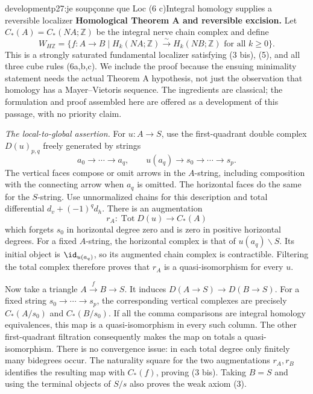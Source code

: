 \begin{dcomment}{development}{p27:je soupçonne que Loc (6 c)}{Integral homology supplies a reversible localizer}
\textbf{Homological Theorem A and reversible excision.}\ours
Let $C_*(A)=C_*(NA;\mathbb Z)$ be the integral nerve chain complex and define
\[
W_{H\mathbb Z}=\{f:A\to B\mid H_k(NA;\mathbb Z)\xrightarrow{\sim}
H_k(NB;\mathbb Z)\text{ for all }k\geq0\}.
\]
This is a strongly saturated fundamental localizer satisfying (3 bis), (5), and all three cube rules (6a,b,c). We include the proof because the ensuing minimality statement needs the actual Theorem A hypothesis, not just the observation that homology has a Mayer--Vietoris sequence. The ingredients are classical; the formulation and proof assembled here are offered as a development of this passage, with no priority claim.

\emph{The local-to-global assertion.} For $u:A\to S$, use the first-quadrant double complex $D(u)_{p,q}$ freely generated by strings
\[
a_0\longrightarrow\cdots\longrightarrow a_q,
\qquad u(a_q)\longrightarrow s_0\longrightarrow\cdots\longrightarrow s_p.
\]
The vertical faces compose or omit arrows in the $A$-string, including composition with the connecting arrow when $a_q$ is omitted. The horizontal faces do the same for the $S$-string. Use unnormalized chains for this description and total differential $d_v+(-1)^q d_h$. There is an augmentation
\[
r_A:\operatorname{Tot}D(u)\longrightarrow C_*(A)
\]
which forgets $s_0$ in horizontal degree zero and is zero in positive horizontal degrees. For a fixed $A$-string, the horizontal complex is that of $u(a_q)\backslash S$. Its initial object is $\id_{u(a_q)}$, so its augmented chain complex is contractible. Filtering the total complex therefore proves that $r_A$ is a quasi-isomorphism for every $u$.

Now take a triangle $A\xrightarrow{f}B\to S$. It induces $D(A\to S)\to D(B\to S)$. For a fixed string $s_0\to\cdots\to s_p$, the corresponding vertical complexes are precisely $C_*(A/s_0)$ and $C_*(B/s_0)$. If all the comma comparisons are integral homology equivalences, this map is a quasi-isomorphism in every such column. The other first-quadrant filtration consequently makes the map on totals a quasi-isomorphism. There is no convergence issue: in each total degree only finitely many bidegrees occur. The naturality square for the two augmentations $r_A,r_B$ identifies the resulting map with $C_*(f)$, proving (3 bis). Taking $B=S$ and using the terminal objects of $S/s$ also proves the weak axiom (3).


\end{dcomment}

